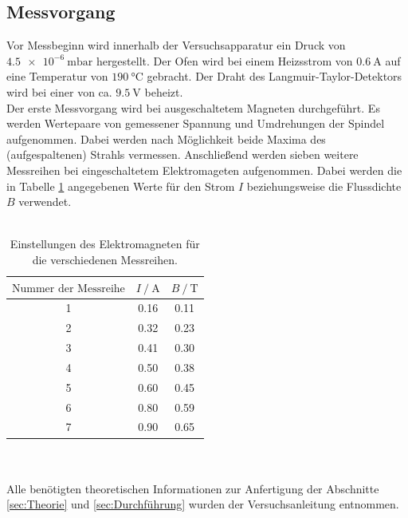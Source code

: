 \subsection{Messvorgang}
\label{subsec:d2}
Vor Messbeginn wird innerhalb der Versuchsapparatur ein Druck von $\SI{4.5e-6}{\milli\bar}$ hergestellt.
Der Ofen wird bei einem Heizsstrom von $\SI{0.6}{\ampere}$ auf eine Temperatur von $\SI{190}{\degreeCelsius}$
gebracht. Der Draht des Langmuir-Taylor-Detektors wird bei einer von ca. $\SI{9.5}{\volt}$ beheizt.\\
Der erste Messvorgang wird bei ausgeschaltetem Magneten durchgeführt. Es werden Wertepaare von gemessener
Spannung und Umdrehungen der Spindel aufgenommen.
Dabei werden nach Möglichkeit beide Maxima des (aufgespaltenen)
Strahls vermessen. Anschließend werden sieben weitere Messreihen bei eingeschaltetem Elektromageten
aufgenommen. Dabei werden die in Tabelle \ref{tab:messtabelle} angegebenen Werte für den
Strom $I$ beziehungsweise die Flussdichte $B$ verwendet.\\ \\
\begin{table}
  \centering
  \caption{Einstellungen des Elektromagneten für die verschiedenen Messreihen.}
  \label{tab:messtabelle}
  \begin{tabular}{c c c}
    \toprule
    $ \text{Nummer der Messreihe} $ & $ I \ / \ \si{\ampere} $ & $B \ / \ \si{\tesla}$\\
    \midrule
    1 & 0.16 & 0.11\\
    2 & 0.32 & 0.23\\
    3 & 0.41 & 0.30\\
    4 & 0.50 & 0.38\\
    5 & 0.60 & 0.45\\
    6 & 0.80 & 0.59\\
    7 & 0.90 & 0.65\\
    \bottomrule
  \end{tabular}
\end{table}
\\ \\Alle benötigten theoretischen Informationen zur Anfertigung der
Abschnitte \ref{sec:Theorie} und \ref{sec:Durchführung}
wurden der Versuchsanleitung \cite{sample} entnommen.
